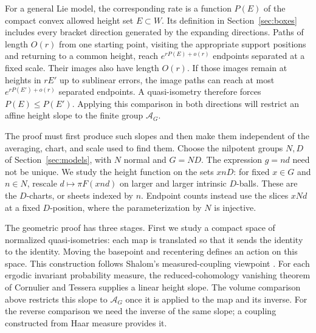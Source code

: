 For a general Lie model, the corresponding rate is a function $P(E)$ of
the compact convex allowed height set $E\subset W$.  Its definition in
Section~\ref{sec:boxes} includes every bracket direction generated by the
expanding directions.  Paths of length $O(r)$ from one starting point,
visiting the appropriate support positions and returning to a common
height, reach
$e^{rP(E)+o(r)}$ endpoints separated at a fixed scale.  Their images also have length
$O(r)$.  If those images remain at heights in $rE'$ up to sublinear
errors, the image paths can
reach at most $e^{rP(E')+o(r)}$ separated endpoints.  A quasi-isometry
therefore forces $P(E)\le P(E')$.  Applying this comparison in both
directions will restrict an affine height slope to the finite group
$\mathcal A_G$.

The proof must first produce such slopes and then make them independent
of the averaging, chart, and scale used to find them.  Choose the
nilpotent groups $N,D$ of Section~\ref{sec:models}, with $N$ normal and
$G=ND$.  The expression $g=nd$ need not be unique.  We study the height
function on the sets $xnD$: for fixed $x\in G$ and $n\in N$, rescale
$d\mapsto\pi F(xnd)$ on larger and larger intrinsic $D$-balls.  These are
the $D$-charts, or sheets indexed by $n$.  Endpoint counts instead use
the slices $xNd$ at a fixed $D$-position, where the parameterization by
$N$ is injective.

The geometric proof has three stages. First we study a compact space of
normalized quasi-isometries: each map is translated so that it sends the
identity to the identity. Moving the basepoint and recentering defines
an action on this space. This construction follows Shalom's
measured-coupling viewpoint \cite[Sections~2.1--2.2]{Shalom2004}.
For each ergodic invariant probability measure, the reduced-cohomology
vanishing theorem of Cornulier and Tessera
\cite[Corollary~1.9]{CornulierTessera2020} supplies a linear height slope.
The volume comparison above restricts this slope to $\mathcal A_G$ once
it is applied to the map and its inverse. For the reverse comparison we
need the inverse of the same slope; a coupling constructed from Haar
measure provides it.

